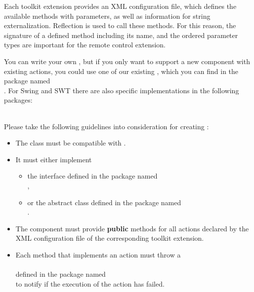 Each \ite{}  toolkit extension provides an XML configuration file, which defines the
available methods with parameters, as well as information for string
externalization. Reflection is used to call these methods. For this reason, the
signature of a defined method including its name, and the ordered parameter
types are important for the remote control extension.

You can write your own \gdtesterclasses, but if you only want to support a new
component with existing actions, you could use one of our existing
\gdtesterclasses, which you can find in the package named\\
. For Swing and SWT there are also
specific implementations in the following packages:\\
\\

Please take the following guidelines into consideration for creating
\gdtesterclasses:
\begin{itemize}
  \item The class must be compatible with .
  \item It must either implement
  \begin{itemize}
    \item the interface  defined in the package named\\
        ,\\
	 \item or the abstract class 
	     defined in the package named\\
	     .
  \end{itemize}
  \item The component must provide \textbf{public} methods for all actions
        declared by the XML configuration file of the corresponding \ite{}
        toolkit extension.
  \item Each method that implements an action must throw a\\
        \\
        defined in the package named\\
        to notify \app{} if the execution of the action has  failed.
\end{itemize}

